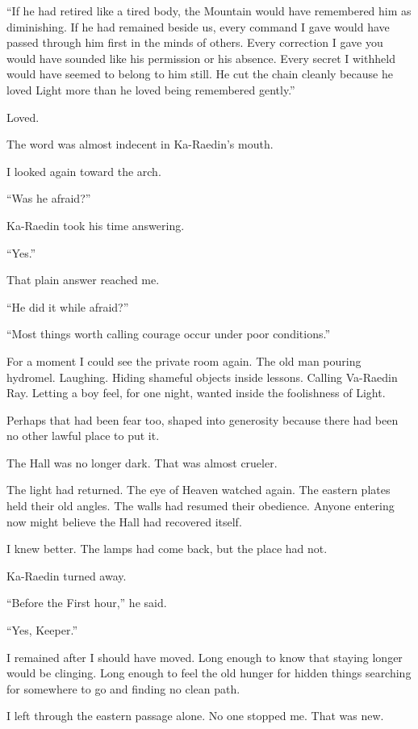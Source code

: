 ``If he had retired like a tired body, the Mountain would have remembered him as diminishing.
If he had remained beside us, every command I gave would have passed through him first in the minds of others.
Every correction I gave you would have sounded like his permission or his absence.
Every secret I withheld would have seemed to belong to him still.
He cut the chain cleanly because he loved Light more than he loved being remembered gently.''\par
Loved.\par
The word was almost indecent in Ka-Raedin's mouth.\par
I looked again toward the arch.\par
``Was he afraid?''\par
Ka-Raedin took his time answering.\par
``Yes.''\par
That plain answer reached me.\par
``He did it while afraid?''\par
``Most things worth calling courage occur under poor conditions.''\par
For a moment I could see the private room again.
The old man pouring hydromel.
Laughing.
Hiding shameful objects inside lessons.
Calling Va-Raedin Ray.
Letting a boy feel, for one night, wanted inside the foolishness of Light.\par
Perhaps that had been fear too, shaped into generosity because there had been no other lawful place to put it.\par
The Hall was no longer dark.
That was almost crueler.\par
The light had returned.
The eye of Heaven watched again.
The eastern plates held their old angles.
The walls had resumed their obedience.
Anyone entering now might believe the Hall had recovered itself.\par
I knew better.
The lamps had come back, but the place had not.\par
Ka-Raedin turned away.\par
``Before the First hour,'' he said.\par
``Yes, Keeper.''\par
I remained after I should have moved.
Long enough to know that staying longer would be clinging.
Long enough to feel the old hunger for hidden things searching for somewhere to go and finding no clean path.\par
I left through the eastern passage alone.
No one stopped me.
That was new.
